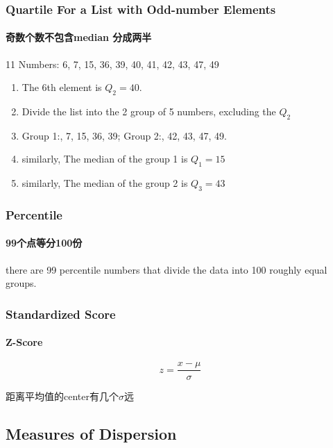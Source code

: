 \documentclass[
	11pt, %
]{beamer}
\begin{document}

\begin{frame}
	\frametitle{Quartile For a List with Odd-number Elements}
	\framesubtitle{奇数个数不包含median 分成两半}

	\begin{example}
	11 Numbers: 6, 7, 15, 36, 39, 40, 41, 42, 43, 47, 49\\
	\begin{enumerate}
		\item The 6th element is $Q_2=40$.
		\item Divide the list into  the 2 group of 5 numbers, excluding the $Q_2$
		\item Group 1:, 7, 15, 36, 39;   Group 2:, 42, 43, 47, 49.
		\item similarly, The median of the group 1 is $Q_1=15$
		\item similarly, The median of the group 2 is $Q_3=43$
	\end{enumerate}
	\end{example}
\end{frame}


\begin{frame}
	\frametitle{Percentile}
	\framesubtitle{99个点等分100份}
	\begin{definition}
	there are 99
percentile numbers that divide the data into 100 roughly equal groups.
	\end{definition}

\end{frame}



\begin{frame}
	\frametitle{Standardized Score}
	\framesubtitle{Z-Score}
	\begin{definition}
	\begin{equation*}
		z = \frac{x - \mu}{\sigma}
	\end{equation*}
	\end{definition}
	\alert{距离平均值的center有几个$\sigma$远}
\end{frame}


\subsection{Measures of Dispersion}
\end{document}
